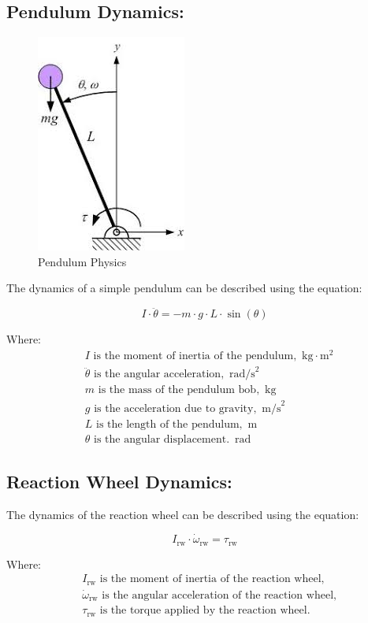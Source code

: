 \documentclass{article}
\begin{document}
\begin{multicols}{2}
\subsection{Pendulum Dynamics:}

\begin{figure}[H]
\centering
\includegraphics[scale=0.5]{images}
\caption{Pendulum Physics}
\label{fig:Pendulum Physics}
\end{figure}
The dynamics of a simple pendulum can be described using the equation:

\[
I \cdot \ddot{\theta} = -m \cdot g \cdot L \cdot \sin(\theta)
\]

Where:
\begin{align*}
&I \text{ is the moment of inertia of the pendulum,  } \, \text{kg} \cdot \text{m}^2\\
&\ddot{\theta} \text{ is the angular acceleration,  } \, \text{rad/s}^2\\
&m \text{ is the mass of the pendulum bob,  } \, \text{kg}\\
&g \text{ is the acceleration due to gravity,  } \, \text{m/s}^2\\
&L \text{ is the length of the pendulum,  } \, \text{m}\\
&\theta \text{ is the angular displacement.  } \, \text{rad}
\end{align*}
      

\subsection{Reaction Wheel Dynamics:}

The dynamics of the reaction wheel can be described using the equation:

\[
I_{\text{rw}} \cdot \dot{\omega}_{\text{rw}} = \tau_{\text{rw}}
\]

Where:
\begin{align*}
&I_{\text{rw}} \text{ is the moment of inertia of the reaction wheel,} \\
&\dot{\omega}_{\text{rw}} \text{ is the angular acceleration of the reaction wheel,} \\
&\tau_{\text{rw}} \text{ is the torque applied by the reaction wheel.}
\end{align*}


\end{multicols}
\end{document}
